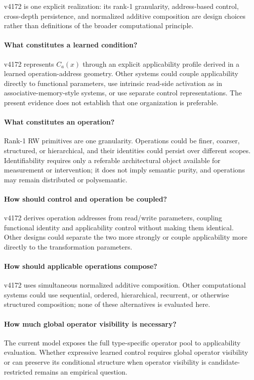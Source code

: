 \documentclass{article}
\begin{document}
v4172 is one explicit realization: its rank-1 granularity, address-based control,
cross-depth persistence, and normalized additive composition are design choices
rather than definitions of the broader computational principle.

\paragraph{What constitutes a learned condition?}
v4172 represents \(C_a(x)\) through an explicit applicability profile derived in
a learned operation-address geometry. Other systems could couple applicability
directly to functional parameters, use intrinsic read-side activation as in
associative-memory-style systems, or use separate control representations. The
present evidence does not establish that one organization is preferable.

\paragraph{What constitutes an operation?}
Rank-1 RW primitives are one granularity. Operations could be finer, coarser,
structured, or hierarchical, and their identities could persist over different
scopes. Identifiability requires only a referable architectural object available
for measurement or intervention; it does not imply semantic purity, and
operations may remain distributed or polysemantic.

\paragraph{How should control and operation be coupled?}
v4172 derives operation addresses from read/write parameters, coupling
functional identity and applicability control without making them identical.
Other designs could separate the two more strongly or couple applicability more
directly to the transformation parameters.

\paragraph{How should applicable operations compose?}
v4172 uses simultaneous normalized additive composition. Other computational
systems could use sequential, ordered, hierarchical, recurrent, or otherwise
structured composition; none of these alternatives is evaluated here.

\paragraph{How much global operator visibility is necessary?}
The current model exposes the full type-specific operator pool to applicability
evaluation. Whether expressive learned control requires global operator
visibility or can preserve its conditional structure when operator visibility is
candidate-restricted remains an empirical question.
\end{document}
